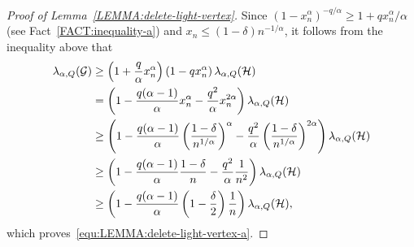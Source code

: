 \documentclass[11pt,a4paper]{article}
\begin{document}
\begin{proof}[Proof of Lemma~\ref{LEMMA:delete-light-vertex}]
    Since $\left(1-x_n^{\alpha}\right)^{-q/\alpha} \ge 1 + q x_{n}^{\alpha}/\alpha$ (see Fact~\ref{FACT:inequality-a}) and $x_n \le (1-\delta)n^{-1/\alpha}$, it follows from the inequality above that 
    \begin{align}\label{equ:Lemma-lambda-G-lower-bound}
        \lambda_{\alpha, Q}(\mathcal{G})
        & \ge \left(1+\frac{q}{\alpha} x_{n}^{\alpha}\right) \left( 1- q x_{n}^{\alpha} \right) \lambda_{\alpha, Q}(\mathcal{H}) \notag \\
        & = \left(1 - \frac{q(\alpha-1)}{\alpha}x_{n}^{\alpha} - \frac{q^2}{\alpha} x_{n}^{2 \alpha}\right) \lambda_{\alpha, Q}(\mathcal{H}) \notag \\
        & \ge \left(1 - \frac{q(\alpha-1)}{\alpha} \left( \frac{1-\delta}{n^{1/\alpha}} \right)^{\alpha}  - \frac{q^2}{\alpha} \left( \frac{1-\delta}{n^{1/\alpha}} \right)^{2 \alpha} \right) \lambda_{\alpha, Q}(\mathcal{H}) \notag \\
        & \ge \left(1 - \frac{q(\alpha-1)}{\alpha} \frac{1-\delta}{n}  - \frac{q^2}{\alpha} \frac{1}{n^2} \right) \lambda_{\alpha, Q}(\mathcal{H}) \notag \\
        & \ge \left(1 - \frac{q(\alpha-1)}{\alpha} \left( 1-\frac{\delta}{2} \right) \frac{1}{n} \right) \lambda_{\alpha, Q}(\mathcal{H}), 
    \end{align}
    which proves~\eqref{equ:LEMMA:delete-light-vertex-a}.


\end{proof}
\end{document}
